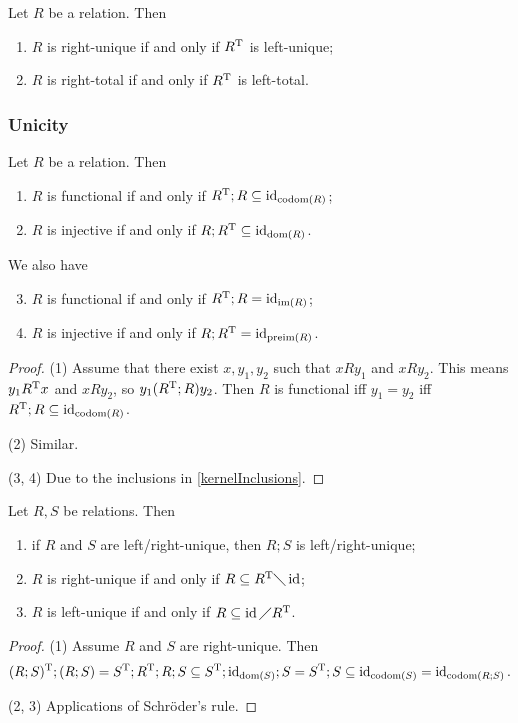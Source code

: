 \begin{lemma}
Let $R$ be a relation. Then
\begin{enumerate}
\item $R$ is right-unique \textup{if and only if} $R^{\mathrm{T}}$ is left-unique;
\item $R$ is right-total \textup{if and only if} $R^{\mathrm{T}}$ is left-total.
\end{enumerate}
\end{lemma}

\subsubsection{Unicity}
\begin{lemma}
Let $R$ be a relation. Then
\begin{enumerate}
\item $R$ is functional \textup{if and only if} $R^{\mathrm{T}}; R \subseteq \operatorname{id}_{\operatorname{codom}(R)}$;
\item $R$ is injective \textup{if and only if} $R; R^{\mathrm{T}} \subseteq \operatorname{id}_{\operatorname{dom}(R)}$.
\end{enumerate}
We also have
\begin{enumerate} \setcounter{enumi}{2}
\item $R$ is functional \textup{if and only if} $R^{\mathrm{T}}; R = \operatorname{id}_{\operatorname{im}(R)}$;
\item $R$ is injective \textup{if and only if} $R; R^{\mathrm{T}} = \operatorname{id}_{\operatorname{preim}(R)}$.
\end{enumerate}
\end{lemma}
\begin{proof}
(1) Assume that there exist $x,y_1,y_2$ such that $xRy_1$ and $xRy_2$. This means $y_1R^{\mathrm{T}} x$ and $xRy_2$, so $y_1(R^{\mathrm{T}}; R) y_2$. Then $R$ is functional iff $y_1 = y_2$ iff $R^{\mathrm{T}}; R \subseteq \operatorname{id}_{\operatorname{codom}(R)}$.

(2) Similar.

(3, 4) Due to the inclusions in \ref{kernelInclusions}.
\end{proof}
\begin{corollary}
Let $R, S$ be relations. Then
\begin{enumerate}
\item if $R$ and $S$ are left/right-unique, then $R;S$ is left/right-unique;
\item $R$ is right-unique \textup{if and only if} $R \subseteq R^{\mathrm{T}} \diagdown \operatorname{id}$;
\item $R$ is left-unique \textup{if and only if} $R\subseteq \operatorname{id} \diagup R^{\mathrm{T}}$.
\end{enumerate}
\end{corollary}
\begin{proof}
(1) Assume $R$ and $S$ are right-unique. Then
\[ (R;S)^{\mathrm{T}}; (R;S) = S^{\mathrm{T}};R^{\mathrm{T}};R;S \subseteq S^{\mathrm{T}};\operatorname{id}_{\operatorname{dom}(S)};S = S^{\mathrm{T}};S \subseteq \operatorname{id}_{\operatorname{codom}(S)} = \operatorname{id}_{\operatorname{codom}(R;S)}. \]

(2, 3) Applications of Schröder's rule.
\end{proof}

